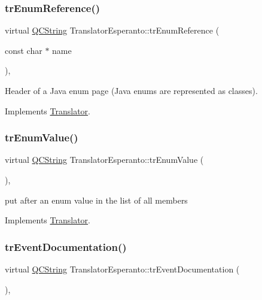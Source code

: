 \subsubsection{\texorpdfstring{trEnumReference()}{trEnumReference()}}
{\footnotesize\ttfamily virtual \mbox{\hyperlink{class_q_c_string}{Q\+C\+String}} Translator\+Esperanto\+::tr\+Enum\+Reference (\begin{DoxyParamCaption}\item[{const char $\ast$}]{name }\end{DoxyParamCaption})\hspace{0.3cm}{\ttfamily [inline]}, {\ttfamily [virtual]}}

Header of a Java enum page (Java enums are represented as classes). 

Implements \mbox{\hyperlink{class_translator}{Translator}}.

\mbox{\label{class_translator_esperanto_a2a6670acd98110ded878f2e121db6292}} 
\subsubsection{\texorpdfstring{trEnumValue()}{trEnumValue()}}
{\footnotesize\ttfamily virtual \mbox{\hyperlink{class_q_c_string}{Q\+C\+String}} Translator\+Esperanto\+::tr\+Enum\+Value (\begin{DoxyParamCaption}{ }\end{DoxyParamCaption})\hspace{0.3cm}{\ttfamily [inline]}, {\ttfamily [virtual]}}

put after an enum value in the list of all members 

Implements \mbox{\hyperlink{class_translator}{Translator}}.

\mbox{\label{class_translator_esperanto_a9ac54cbfd7723d0d083b0c5668d03e84}} 
\subsubsection{\texorpdfstring{trEventDocumentation()}{trEventDocumentation()}}
{\footnotesize\ttfamily virtual \mbox{\hyperlink{class_q_c_string}{Q\+C\+String}} Translator\+Esperanto\+::tr\+Event\+Documentation (\begin{DoxyParamCaption}{ }\end{DoxyParamCaption})\hspace{0.3cm}{\ttfamily [inline]}, {\ttfamily [virtual]}}


